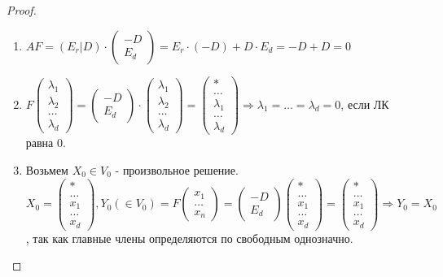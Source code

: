 \begin{proof}
	\begin{enumerate}
		\item \(AF = (E_r|D)\cdot\begin{pmatrix}
			-D \\ E_d
		\end{pmatrix} = E_r\cdot(-D)+D\cdot E_d = -D + D = 0\)
		\item \(F\begin{pmatrix}
			\lambda_1 \\ \lambda_2 \\ \ldots \\ \lambda_d
		\end{pmatrix} = \begin{pmatrix}
		-D \\ E_d
		\end{pmatrix}\cdot \begin{pmatrix}
		\lambda_1 \\ \lambda_2 \\ \ldots \\ \lambda_d
		\end{pmatrix} = \begin{pmatrix}
		* \\ \ldots \\ \lambda_1 \\ \ldots \\ \lambda_d
		\end{pmatrix}\Longrightarrow \lambda_1 = \ldots = \lambda_d = 0\), если ЛК равна 0.
		\item Возьмем \(X_0\in V_0\) - произвольное решение. \(X_0 = \begin{pmatrix}
			* \\ \ldots \\ x_1 \\ \ldots \\ x_d
		\end{pmatrix}, Y_0(\in V_0) = F\begin{pmatrix}
		x_1 \\ \ldots \\ x_n
		\end{pmatrix} = \begin{pmatrix}
		-D \\ E_d
		\end{pmatrix}\begin{pmatrix}
		* \\ \ldots \\ x_1 \\ \ldots \\ x_d
		\end{pmatrix} = \begin{pmatrix}
		* \\ \ldots \\ x_1 \\ \ldots \\ x_d 
		\end{pmatrix}\Longrightarrow Y_0 = X_0\), так как главные члены определяются по свободным однозначно.
	\end{enumerate}

\end{proof}
